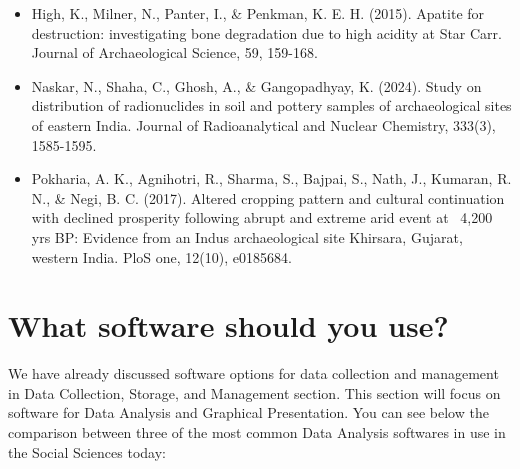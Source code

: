 \documentclass{article}
\begin{document}
\begin{itemize}
    \item \hypertarget{high}{High, K., Milner, N., Panter, I., \& Penkman, K. E. H. (2015). Apatite for destruction: investigating bone degradation due to high acidity at Star Carr. Journal of Archaeological Science, 59, 159-168.}
    \item \hypertarget{naskar}{Naskar, N., Shaha, C., Ghosh, A., \& Gangopadhyay, K. (2024). Study on distribution of radionuclides in soil and pottery samples of archaeological sites of eastern India. Journal of Radioanalytical and Nuclear Chemistry, 333(3), 1585-1595.}
    \item \hypertarget{pokharia}{Pokharia, A. K., Agnihotri, R., Sharma, S., Bajpai, S., Nath, J., Kumaran, R. N., \& Negi, B. C. (2017). Altered cropping pattern and cultural continuation with declined prosperity following abrupt and extreme arid event at~ 4,200 yrs BP: Evidence from an Indus archaeological site Khirsara, Gujarat, western India. PloS one, 12(10), e0185684.}
\end{itemize}

\section{What software should you use?}
We have already discussed software options for data collection and management in Data Collection, Storage, and Management section. This section will focus on software for Data Analysis and Graphical Presentation. You can see below the comparison between three of the most common Data Analysis softwares in use in the Social Sciences today:
\end{document}
